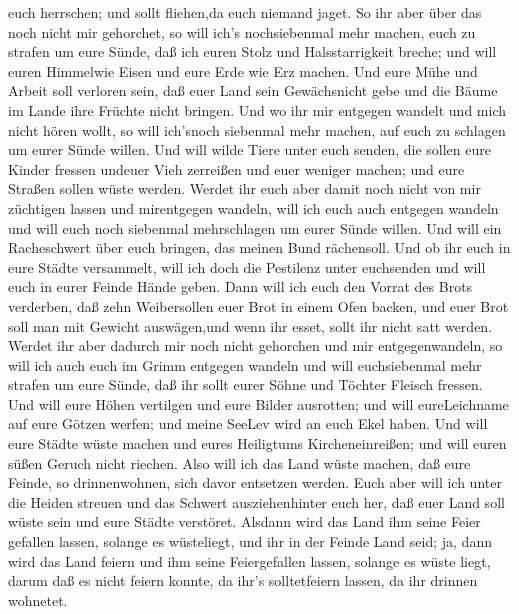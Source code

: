 euch herrschen; und sollt fliehen,da euch niemand jaget. 
So ihr aber über das noch nicht mir gehorchet, so will ich's
nochsiebenmal mehr machen, euch zu strafen um eure Sünde, 
daß ich euren Stolz und Halsstarrigkeit breche; und will euren Himmelwie
Eisen und eure Erde wie Erz machen.  Und eure Mühe und
Arbeit soll verloren sein, daß euer Land sein Gewächsnicht gebe und die
Bäume im Lande ihre Früchte nicht bringen.  Und wo ihr mir
entgegen wandelt und mich nicht hören wollt, so will ich'snoch siebenmal
mehr machen, auf euch zu schlagen um eurer Sünde willen. 
Und will wilde Tiere unter euch senden, die sollen eure Kinder fressen
undeuer Vieh zerreißen und euer weniger machen; und eure Straßen sollen
wüste werden.  Werdet ihr euch aber damit noch nicht von
mir züchtigen lassen und mirentgegen wandeln,  will ich
euch auch entgegen wandeln und will euch noch siebenmal mehrschlagen um
eurer Sünde willen.  Und will ein Racheschwert über euch
bringen, das meinen Bund rächensoll. Und ob ihr euch in eure Städte
versammelt, will ich doch die Pestilenz unter euchsenden und will euch
in eurer Feinde Hände geben.  Dann will ich euch den Vorrat
des Brots verderben, daß zehn Weibersollen euer Brot in einem Ofen
backen, und euer Brot soll man mit Gewicht auswägen,und wenn ihr esset,
sollt ihr nicht satt werden.  Werdet ihr aber dadurch mir
noch nicht gehorchen und mir entgegenwandeln,  so will ich
auch euch im Grimm entgegen wandeln und will euchsiebenmal mehr strafen
um eure Sünde,  daß ihr sollt eurer Söhne und Töchter
Fleisch fressen.  Und will eure Höhen vertilgen und eure
Bilder ausrotten; und will eureLeichname auf eure Götzen werfen; und
meine SeeLev wird an euch Ekel haben.  Und will eure Städte
wüste machen und eures Heiligtums Kircheneinreißen; und will euren süßen
Geruch nicht riechen.  Also will ich das Land wüste machen,
daß eure Feinde, so drinnenwohnen, sich davor entsetzen werden.
 Euch aber will ich unter die Heiden streuen und das
Schwert ausziehenhinter euch her, daß euer Land soll wüste sein und eure
Städte verstöret.  Alsdann wird das Land ihm seine Feier
gefallen lassen, solange es wüsteliegt, und ihr in der Feinde Land seid;
ja, dann wird das Land feiern und ihm seine Feiergefallen lassen,
 solange es wüste liegt, darum daß es nicht feiern konnte,
da ihr's solltetfeiern lassen, da ihr drinnen wohnetet. 
